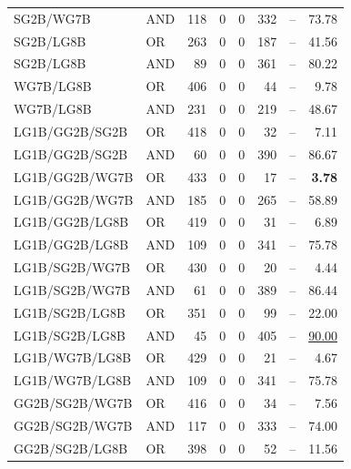 \documentclass{article}
\begin{document}
{\begin{longtable}{llrrrrrr}
 SG2B/WG7B                & AND     &  118 &    0 &    0 &  332 & --    & 73.78             \\
 SG2B/LG8B                & OR      &  263 &    0 &    0 &  187 & --    & 41.56             \\
 SG2B/LG8B                & AND     &   89 &    0 &    0 &  361 & --    & 80.22             \\
 WG7B/LG8B                & OR      &  406 &    0 &    0 &   44 & --    & 9.78              \\
 WG7B/LG8B                & AND     &  231 &    0 &    0 &  219 & --    & 48.67             \\
 LG1B/GG2B/SG2B           & OR      &  418 &    0 &    0 &   32 & --    & 7.11              \\
 LG1B/GG2B/SG2B           & AND     &   60 &    0 &    0 &  390 & --    & 86.67             \\
 LG1B/GG2B/WG7B           & OR      &  433 &    0 &    0 &   17 & --    & \textbf{3.78}     \\
 LG1B/GG2B/WG7B           & AND     &  185 &    0 &    0 &  265 & --    & 58.89             \\
 LG1B/GG2B/LG8B           & OR      &  419 &    0 &    0 &   31 & --    & 6.89              \\
 LG1B/GG2B/LG8B           & AND     &  109 &    0 &    0 &  341 & --    & 75.78             \\
 LG1B/SG2B/WG7B           & OR      &  430 &    0 &    0 &   20 & --    & 4.44              \\
 LG1B/SG2B/WG7B           & AND     &   61 &    0 &    0 &  389 & --    & 86.44             \\
 LG1B/SG2B/LG8B           & OR      &  351 &    0 &    0 &   99 & --    & 22.00             \\
 LG1B/SG2B/LG8B           & AND     &   45 &    0 &    0 &  405 & --    & \underline{90.00} \\
 LG1B/WG7B/LG8B           & OR      &  429 &    0 &    0 &   21 & --    & 4.67              \\
 LG1B/WG7B/LG8B           & AND     &  109 &    0 &    0 &  341 & --    & 75.78             \\
 GG2B/SG2B/WG7B           & OR      &  416 &    0 &    0 &   34 & --    & 7.56              \\
 GG2B/SG2B/WG7B           & AND     &  117 &    0 &    0 &  333 & --    & 74.00             \\
 GG2B/SG2B/LG8B           & OR      &  398 &    0 &    0 &   52 & --    & 11.56             \\

\end{longtable}}
\end{document}
